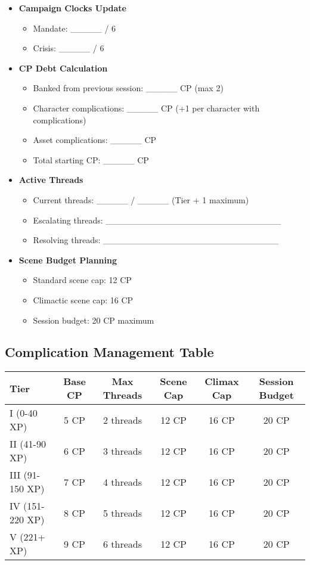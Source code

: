 \documentclass[11pt,letterpaper]{article}
\begin{document}
\begin{itemize}
    \item \textbf{Campaign Clocks Update}
    \begin{itemize}
        \item Mandate: \_\_\_\_\_ / 6
        \item Crisis: \_\_\_\_\_ / 6
    \end{itemize}
    
    \item \textbf{CP Debt Calculation}
    \begin{itemize}
        \item Banked from previous session: \_\_\_\_\_ CP (max 2)
        \item Character complications: \_\_\_\_\_ CP (+1 per character with complications)
        \item Asset complications: \_\_\_\_\_ CP
        \item Total starting CP: \_\_\_\_\_ CP
    \end{itemize}
    
    \item \textbf{Active Threads}
    \begin{itemize}
        \item Current threads: \_\_\_\_\_ / \_\_\_\_\_ (Tier + 1 maximum)
        \item Escalating threads: \_\_\_\_\_\_\_\_\_\_\_\_\_\_\_\_\_\_\_\_\_\_\_\_\_\_\_\_
        \item Resolving threads: \_\_\_\_\_\_\_\_\_\_\_\_\_\_\_\_\_\_\_\_\_\_\_\_\_\_\_\_
    \end{itemize}
    
    \item \textbf{Scene Budget Planning}
    \begin{itemize}
        \item Standard scene cap: 12 CP
        \item Climactic scene cap: 16 CP
        \item Session budget: 20 CP maximum
    \end{itemize}
\end{itemize}

\subsection{Complication Management Table}

\begin{tabularx}{\textwidth}{|l|c|c|c|c|c|}
\hline
\textbf{Tier} & \textbf{Base CP} & \textbf{Max Threads} & \textbf{Scene Cap} & \textbf{Climax Cap} & \textbf{Session Budget} \\
\hline
I (0-40 XP) & 5 CP & 2 threads & 12 CP & 16 CP & 20 CP \\
II (41-90 XP) & 6 CP & 3 threads & 12 CP & 16 CP & 20 CP \\
III (91-150 XP) & 7 CP & 4 threads & 12 CP & 16 CP & 20 CP \\
IV (151-220 XP) & 8 CP & 5 threads & 12 CP & 16 CP & 20 CP \\
V (221+ XP) & 9 CP & 6 threads & 12 CP & 16 CP & 20 CP \\
\hline
\end{tabularx}
\end{document}
